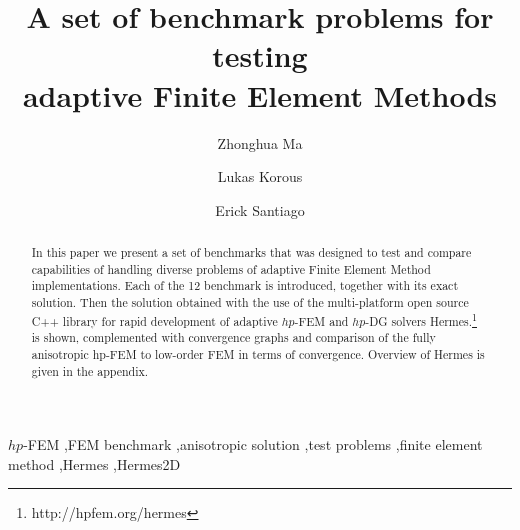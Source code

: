 \begin{frontmatter}

\title{A set of benchmark problems for testing\\ adaptive Finite Element Methods}

\author[label1]{Zhonghua Ma}
\author[label2]{Lukas Korous}
\author[label3]{Erick Santiago}
\address[label1]{China University of Petroleum, Beijing, China}
\address[label2]{Charles University, Prague, Czech Republic}
\address[label3]{University of Nevada, Reno, USA}

\begin{abstract}
In this paper we present a set of benchmarks that was designed to
test and compare capabilities of handling diverse problems of adaptive Finite Element Method implementations. Each of the 12 benchmark is introduced, together with its exact solution. Then the solution obtained with the use of the multi-platform open source C++ library for rapid development of adaptive $hp$-FEM and $hp$-DG solvers {\sc Hermes}.\footnote{http://hpfem.org/hermes} is shown, complemented with convergence graphs and comparison of the fully anisotropic hp-FEM to low-order FEM in terms of convergence.
Overview of Hermes is given in the appendix.
\end{abstract}

\begin{keyword}
$hp$-FEM \sep FEM benchmark \sep anisotropic solution \sep test problems \sep finite element method \sep Hermes \sep Hermes2D
\end{keyword}

\end{frontmatter}
